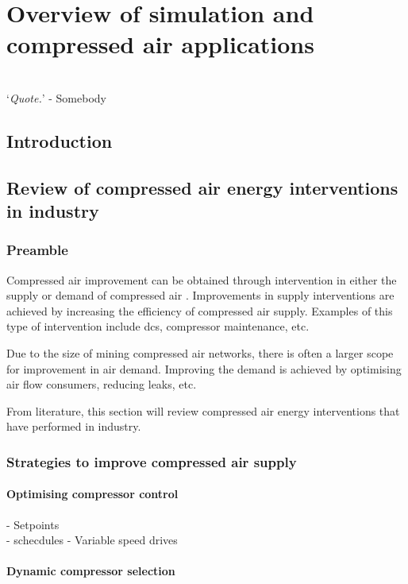 \chapter{Overview of simulation and compressed air applications}
\thispagestyle{empty}
\vspace{38em}
\hrulefill
\\
\enquote*{\textit{Quote.}} - Somebody\\
\clearpage
\section{Introduction}
\section{Review of compressed air energy interventions in industry}
	\subsection{Preamble}
		Compressed air improvement can be obtained through intervention in either the supply or demand of compressed air \cite{Kriel2014Masters}. Improvements in supply interventions are achieved by increasing the efficiency of compressed air supply. Examples of this type of intervention include \gls{dcs}, compressor maintenance, etc. 
		\par
		Due to the size of mining compressed air networks, there is often a larger scope for improvement in air demand. Improving the  demand is achieved by optimising air flow consumers, reducing leaks, etc.
		\par
	 	From literature, this section will review compressed air energy interventions that have performed in industry.
	\subsection{Strategies to improve compressed air supply}
		\subsubsection{Optimising compressor control}
		- Setpoints\\
		- schecdules
		- Variable speed drives\\
		\subsubsection{Dynamic compressor selection}
